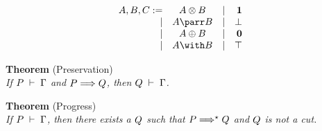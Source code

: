 \documentclass[aspectratio=169,xcolor={dvipsnames}]{beamer}
\begin{document}
  \begin{frame}[plain]
    \Large
    \[
      \begin{array}{rclrcl}
        \ty{A}, \ty{B}, \ty{C}
            := & \ty{A \tens B}
        &  \mid& \ty{\one}
        \\ \mid& \ty{A \parr B}
        &  \mid& \ty{\bot}
        \\ \mid& \ty{A \plus B}
        &  \mid& \ty{\nil}
        \\ \mid& \ty{A \with B}
        &  \mid& \ty{\top}
      \end{array}
    \]
  \end{frame}

  \begin{frame}[plain]
    \large
    \begin{center}
      \cpInfAx \cpInfCut
    \end{center}
    \begin{center}
      \cpInfTens \cpInfParr
    \end{center}
    \begin{center}
      \cpInfBot \cpInfOne
    \end{center}
    \begin{center}
       
    \end{center}
    \begin{center}
      \cpInfWith
    \end{center}
    \begin{center}
      \cpInfNil \cpInfTop
    \end{center}
  \end{frame}

  \begin{frame}[plain]
    \Huge
    \textbf{Theorem} (Preservation)\\
    \textit{%
      If $\seq[P]{\Gamma}$ and $\tm{P}\Longrightarrow\tm{Q}$, then $\seq[Q]{\Gamma}$.
    }
  \end{frame}

  \begin{frame}[plain]
    \Huge
    \textbf{Theorem} (Progress)\\
    \textit{%
      If $\seq[P]{\Gamma}$, then there exists a $\tm{Q}$ such that
      $\tm{P}\Longrightarrow^\star\tm{Q}$ and $\tm{Q}$ is not a cut.
    }
  \end{frame}

  \setcounter{framenumber}{0}
\end{document}
